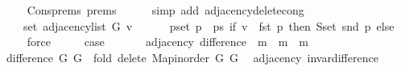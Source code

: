 \begin{isabellebody}
\ \ \ \ \isamarkupfalse%
\ Cons{\isachardot}{\kern0pt}prems{\isacharparenleft}{\kern0pt}{}{\isacharparenright}{\kern0pt}\ prems{\isacharparenleft}{\kern0pt}{}{\isacharparenright}{\kern0pt}\isanewline
\ \ \ \ \isamarkupfalse%
\ {\isacharparenleft}{\kern0pt}simp\ add{\isacharcolon}{\kern0pt}\ adjacency{\isacharunderscore}{\kern0pt}delete{\isacharunderscore}{\kern0pt}{}{\isacharunderscore}{\kern0pt}cong{\isacharparenright}{\kern0pt}\isanewline
\ \ \isamarkupfalse%
\ \isamarkupfalse%
\isanewline
\ \ \ \ {\isachardoublequoteopen}{\isachardot}{\kern0pt}{\isachardot}{\kern0pt}{\isachardot}{\kern0pt}\ {\isacharequal}{\kern0pt}\isanewline
\ \ \ \ \ set\ {\isacharparenleft}{\kern0pt}adjacency{\isacharunderscore}{\kern0pt}list\ G\ v{\isacharparenright}{\kern0pt}\ {\isacharminus}{\kern0pt}\isanewline
\ \ \ \ \ {\isacharparenleft}{\kern0pt}{\isasymUnion}p{\isasymin}set\ {\isacharparenleft}{\kern0pt}p\ {\isacharhash}{\kern0pt}\ ps{\isacharparenright}{\kern0pt}{\isachardot}{\kern0pt}\ if\ v\ {\isacharequal}{\kern0pt}\ fst\ p\ then\ S{\isachardot}{\kern0pt}set\ {\isacharparenleft}{\kern0pt}snd\ p{\isacharparenright}{\kern0pt}\ else\ {\isacharbraceleft}{\kern0pt}{\isacharbraceright}{\kern0pt}{\isacharparenright}{\kern0pt}{\isachardoublequoteclose}\isanewline
\ \ \ \ \isamarkupfalse%
\ force\isanewline
\ \ \isamarkupfalse%
\ \isamarkupfalse%
\ {\isacharquery}{\kern0pt}case\isanewline
\ \ \ \ \isacommand{{\isachardot}{\kern0pt}}\isamarkupfalse%
\isanewline
{}\isamarkupfalse%
%
\endisatagproof
{\isafoldproof}%
%
\isadelimproof
\isanewline
%
\endisadelimproof
\isanewline
\isanewline
{}\isamarkupfalse%
\ {\isacharparenleft}{\kern0pt}\ adjacency{\isacharparenright}{\kern0pt}\ difference\ {\isacharcolon}{\kern0pt}{\isacharcolon}{\kern0pt}\ {\isachardoublequoteopen}{\isacharprime}{\kern0pt}m\ {\isasymRightarrow}\ {\isacharprime}{\kern0pt}m\ {\isasymRightarrow}\ {\isacharprime}{\kern0pt}m{\isachardoublequoteclose}\ \isanewline
\ \ {\isachardoublequoteopen}difference\ G{}\ G{}\ {\isasymequiv}\ fold\ delete{\isacharunderscore}{\kern0pt}{}\ {\isacharparenleft}{\kern0pt}Map{\isacharunderscore}{\kern0pt}inorder\ G{}{\isacharparenright}{\kern0pt}\ G{}{\isachardoublequoteclose}\isanewline
\isanewline
{}\isamarkupfalse%
\ {\isacharparenleft}{\kern0pt}\ adjacency{\isacharparenright}{\kern0pt}\ invar{\isacharunderscore}{\kern0pt}difference{\isacharcolon}{\kern0pt}\isanewline

\end{isabellebody}
